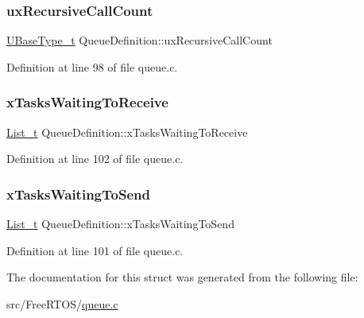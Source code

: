 \subsubsection{\texorpdfstring{ux\+Recursive\+Call\+Count}{uxRecursiveCallCount}}
{\footnotesize\ttfamily \hyperlink{portmacro_8h_a646f89d4298e4f5afd522202b11cb2e6}{U\+Base\+Type\+\_\+t} Queue\+Definition\+::ux\+Recursive\+Call\+Count}



Definition at line 98 of file queue.\+c.

\mbox{\label{struct_queue_definition_af6d61526f77beee659cd604a0c473359}} 
\subsubsection{\texorpdfstring{x\+Tasks\+Waiting\+To\+Receive}{xTasksWaitingToReceive}}
{\footnotesize\ttfamily \hyperlink{list_8h_afd590ef6400071b4d63d65ef90bea7f4}{List\+\_\+t} Queue\+Definition\+::x\+Tasks\+Waiting\+To\+Receive}



Definition at line 102 of file queue.\+c.

\mbox{\label{struct_queue_definition_aaab135c4345cb0393d6ff3cd5164c7b2}} 
\subsubsection{\texorpdfstring{x\+Tasks\+Waiting\+To\+Send}{xTasksWaitingToSend}}
{\footnotesize\ttfamily \hyperlink{list_8h_afd590ef6400071b4d63d65ef90bea7f4}{List\+\_\+t} Queue\+Definition\+::x\+Tasks\+Waiting\+To\+Send}



Definition at line 101 of file queue.\+c.



The documentation for this struct was generated from the following file\+:\begin{DoxyCompactItemize}
\item 
src/\+Free\+R\+T\+O\+S/\hyperlink{queue_8c}{queue.\+c}\end{DoxyCompactItemize}
